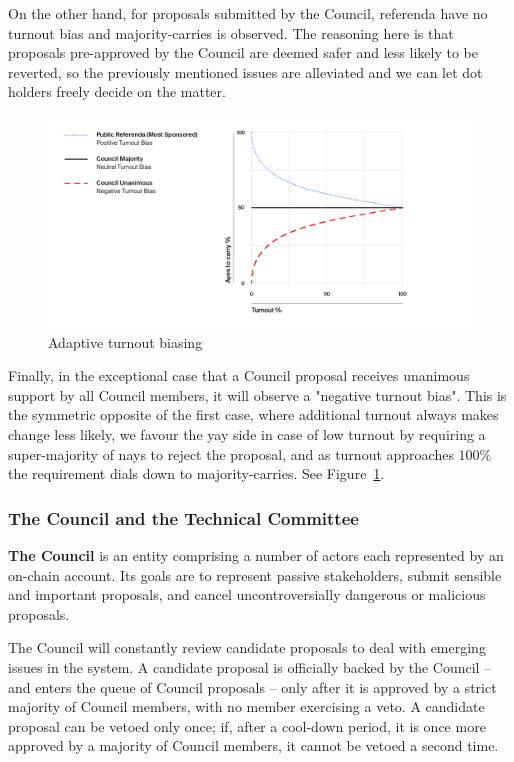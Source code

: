 On the other hand, for proposals submitted by the Council, referenda have no turnout bias and majority-carries is observed. The reasoning here is that proposals pre-approved by the Council are deemed safer and less likely to be reverted, so the previously mentioned issues are alleviated and we can let dot holders freely decide on the matter. 

\begin{figure}[h!]
  \centering
  \includegraphics[width=1.1\textwidth]{images/Turnout-Bias.png}
  \caption{Adaptive turnout biasing}
    \label{fig:biasing}
\end{figure}

Finally, in the exceptional case that a Council proposal receives unanimous support by all Council members, it will observe a "negative turnout bias". This is the symmetric opposite of the first case, where additional turnout always makes change less likely, we favour the yay side in case of low turnout by requiring a super-majority of nays to reject the proposal, and as turnout approaches $100\%$ the requirement dials down to majority-carries. See Figure~\ref{fig:biasing}.


\subsubsection{The Council and the Technical Committee}\label{s:council}

\textbf{The Council} is an entity comprising a number of actors each represented by an on-chain account. Its goals are to represent passive stakeholders, submit sensible and important proposals, and cancel uncontroversially dangerous or malicious proposals.

The Council will constantly review candidate proposals to deal with emerging issues in the system. A candidate proposal is officially backed by the Council -- and enters the queue of Council proposals -- only after it is approved by a strict majority of Council members, with no member exercising a veto. A candidate proposal can be vetoed only once; if, after a cool-down period, it is once more approved by a majority of Council members, it cannot be vetoed a second time. 

